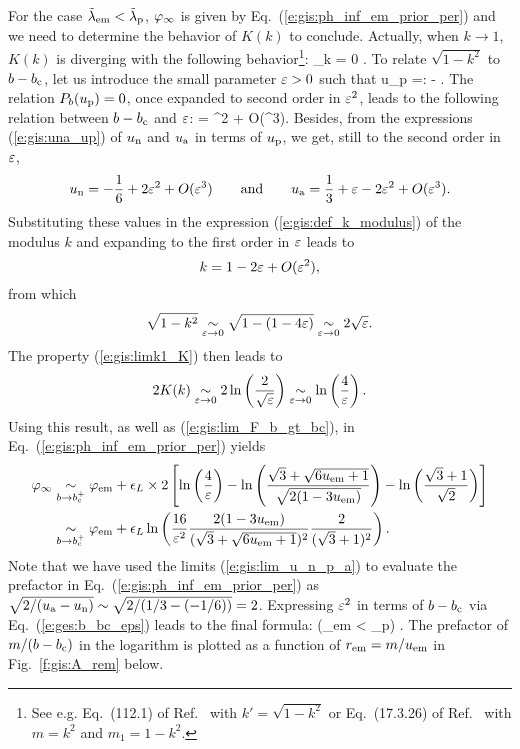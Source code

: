 For the case ${\tilde\lambda}_{\rm em} < {\tilde\lambda}_{\rm p}$, $\varphi_\infty$ is given
by Eq.~(\ref{e:gis:ph_inf_em_prior_per}) and
we need to determine the behavior of $K(k)$ to conclude.
Actually, when $k\to 1$, $K(k)$ is diverging with the following behavior\footnote{See e.g. Eq.~(112.1) of Ref.~\cite{ByrdF71} with
$k' = \sqrt{1-k^2}$ or Eq.~(17.3.26) of
Ref.~\cite{AbramS72} with $m = k^2$ and $m_1 = 1 - k^2$.}:
\be \label{e:gis:limk1_K}
    \lim_{k}  = 0 .
\ee
To relate $\sqrt{1 - k^2}$ to $b - b_{\rm c}$, let us introduce the small parameter
$\varepsilon >0$ such that
\be \label{e:ges:u_per_eps}
    u_{\rm p} =:  - \veps.
\ee
The relation $P_b(u_{\rm p}) = 0$, once expanded to second
order in $\varepsilon^2$, leads to the following relation between $b - b_{\rm c}$
and $\varepsilon$:
\be \label{e:ges:b_bc_eps}
     =  \veps^2 + O(\veps^3).
\ee
Besides, from the expressions (\ref{e:gis:una_up}) of $u_{\rm n}$ and
$u_{\rm a}$ in terms of $u_{\rm p}$, we get, still to the second order in $\varepsilon$,
\[
    u_{\rm n} = - \frac{1}{6} + 2 \varepsilon^2 + O(\varepsilon^3)
    \qquad\mbox{and}\qquad
    u_{\rm a} = \frac{1}{3} + \varepsilon - 2 \varepsilon^2
     + O(\varepsilon^3) .
\]
Substituting these values in the expression (\ref{e:gis:def_k_modulus})
of the modulus $k$ and expanding to the first order in $\varepsilon$ leads to
\[
    k = 1 - 2 \varepsilon + O(\varepsilon^2),
\]
from which
\[
    \sqrt{1 - k^2} \underset{\varepsilon\to 0}{\sim} \sqrt{1 - (1 - 4\varepsilon)}
            \underset{\varepsilon\to 0}{\sim}  2 \sqrt{\varepsilon} .
\]
The property (\ref{e:gis:limk1_K}) then leads to
\[
    2 K(k) \underset{\varepsilon\to 0}{\sim} 2 \ln\left(\frac{2}{\sqrt{\varepsilon}}\right)
       \underset{\varepsilon\to 0}{\sim} \ln\left(\frac{4}{\varepsilon}\right)  .
\]
Using this result, as well as (\ref{e:gis:lim_F_b_gt_bc}), in
Eq.~(\ref{e:gis:ph_inf_em_prior_per}) yields
\begin{align}
  \varphi_\infty & \underset{b\to b_{\rm c}^+}{\sim} \varphi_{\rm em}
   + \epsilon_L \times 2 \left[ \ln\left(\frac{4}{\varepsilon}\right)
   - \ln \left(
     \frac{\sqrt{3} + \sqrt{6 u_{\rm em} + 1 }}{\sqrt{2(1 - 3 u_{\rm em})}} \right)
   - \ln \left(\frac{\sqrt{3} + 1}{\sqrt{2}} \right) \right] \nonumber \\
   & \underset{b\to b_{\rm c}^+}{\sim} \varphi_{\rm em}
   + \epsilon_L \ln\left(\frac{16}{\varepsilon^2}
   \frac{2(1 - 3 u_{\rm em})}{(\sqrt{3} + \sqrt{6 u_{\rm em} + 1 })^2}
   \frac{2}{(\sqrt{3} + 1)^2} \right) . \nonumber
\end{align}
Note that we have used the limits (\ref{e:gis:lim_u_n_p_a})
to evaluate the prefactor in Eq.~(\ref{e:gis:ph_inf_em_prior_per})
as $\sqrt{2/(u_{\rm a} - u_{\rm n})} \sim \sqrt{2/(1/3 - (-1/6))} = 2$.
Expressing $\varepsilon^2$ in terms of $b - b_{\rm c}$ via Eq.~(\ref{e:ges:b_bc_eps})
leads to the final formula:
\be \label{e:gis:ph_inf_ph_em_lim_b_gt_bc}
    \qquad (\tlamb_{\rm em} < \tlamb_{\rm p}) .
\ee
The prefactor of $m/(b - b_{\rm c})$ in the logarithm is
plotted as a function of $r_{\rm em} = m/u_{\rm em}$ in Fig.~\ref{f:gis:A_rem} below.

